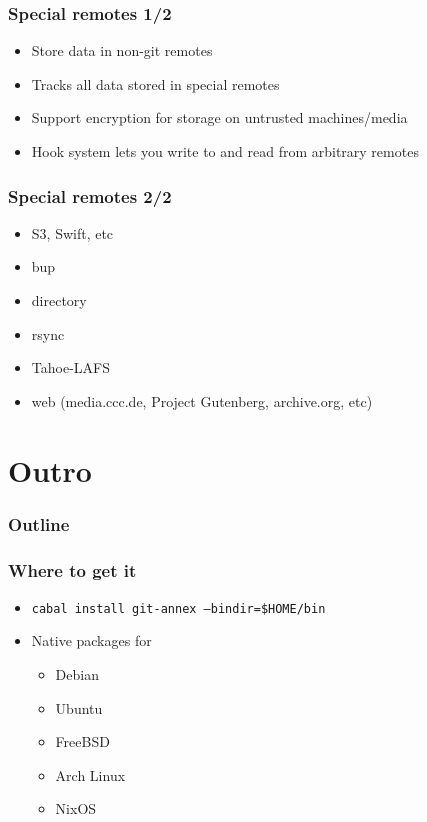 \documentclass[t]{beamer}
\begin{document}
\begin{frame}
	\frametitle{Special remotes 1/2}
	\begin{itemize}
		\item Store data in non-git remotes
		\item Tracks all data stored in special remotes
		\item Support encryption for storage on untrusted machines/media
		\item Hook system lets you write to and read from arbitrary remotes
	\end{itemize}
\end{frame}

\begin{frame}
	\frametitle{Special remotes 2/2}
	\begin{itemize}
		\item S3, Swift, etc
		\item bup
		\item directory
		\item rsync
		\item Tahoe-LAFS
		\item web (media.ccc.de, Project Gutenberg, archive.org, etc)
	\end{itemize}
\end{frame}


\section{Outro}

\begin{frame}
	\frametitle{Outline}
	\tableofcontents[currentsection]
\end{frame}

\begin{frame}
	\frametitle{Where to get it}
	\begin{itemize}
		\item \texttt{cabal install git-annex --bindir=\$HOME/bin}
		\item Native packages for
		\begin{itemize}
			\item Debian
			\item Ubuntu
			\item FreeBSD
			\item Arch Linux
			\item NixOS
		\end{itemize}
	\end{itemize}
\end{frame}
\end{document}
